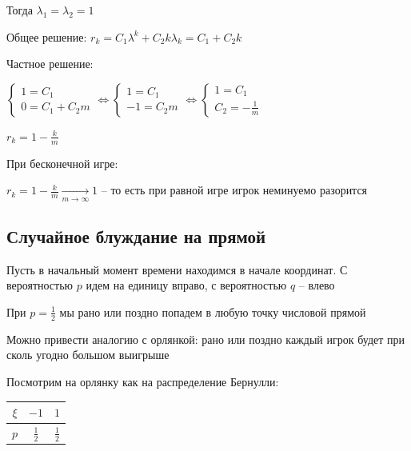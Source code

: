 \documentclass[12pt]{article}
\begin{document}
\begin{itemize}
        Тогда $\lambda_1 = \lambda_2 = 1$

        Общее решение: $r_k = C_1 \lambda^k + C_2 k \lambda_k = C_1 + C_2 k$

        Частное решение: 
        
        $\begin{cases}
            1 = C_1 \\
            0 = C_1 + C_2 m
        \end{cases} \Longleftrightarrow \begin{cases}
            1 = C_1 \\
            -1 = C_2 m
        \end{cases} \Longleftrightarrow \begin{cases}
            1 = C_1 \\
            C_2 = -\frac{1}{m}
        \end{cases}$

        $r_k = 1 - \frac{k}{m}$

        При бесконечной игре:

        $r_k = 1 - \frac{k}{m} \underset{m \to \infty}{\longrightarrow} 1$ -- то есть при равной игре игрок неминуемо разорится 

    \end{itemize}

    \subsection{Случайное блуждание на прямой}

    Пусть в начальный момент времени находимся в начале координат. С вероятностью $p$ идем на единицу вправо, с вероятностью $q$ -- влево

    При $p = \frac{1}{2}$ мы рано или поздно попадем в любую точку числовой прямой

    Можно привести аналогию с орлянкой: рано или поздно каждый игрок будет при сколь угодно большом выигрыше

    Посмотрим на орлянку как на распределение Бернулли:

    \smallvspace

    \begin{tabular}{c|c|c}
        $\xi$ & $-1$        & $1$    \\
        \hline
        $p$   & $\frac{1}{2}$ & $\frac{1}{2}$
    \end{tabular}

    \smallvspace
\end{document}
